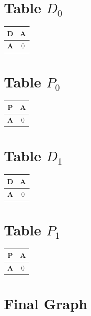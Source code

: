 \documentclass{article}
\begin{document}
\section{Table $D_{0}$}
\begin{center}
    \begin{tabular}{|c||c|}
        \hline
        \textbf{D} & \textbf{A} \\
        \hline
        \hline
        \textbf{A}& 0 \\
        \hline
    \end{tabular}
\end{center}


\section{Table $P_{0}$}
\begin{center}
    \begin{tabular}{|c||c|}
        \hline
        \textbf{P} & \textbf{A} \\
        \hline
        \hline
        \textbf{A}& 0 \\
        \hline
    \end{tabular}
\end{center}


\section{Table $D_{1}$}
\begin{center}
    \begin{tabular}{|c||c|}
        \hline
        \textbf{D} & \textbf{A} \\
        \hline
        \hline
        \textbf{A}& 0 \\
        \hline
    \end{tabular}
\end{center}


\section{Table $P_{1}$}
\begin{center}
    \begin{tabular}{|c||c|}
        \hline
        \textbf{P} & \textbf{A} \\
        \hline
        \hline
        \textbf{A}& 0 \\
        \hline
    \end{tabular}
\end{center}


\section{Final Graph}
\begin{center}
\end{center}
\end{document}
